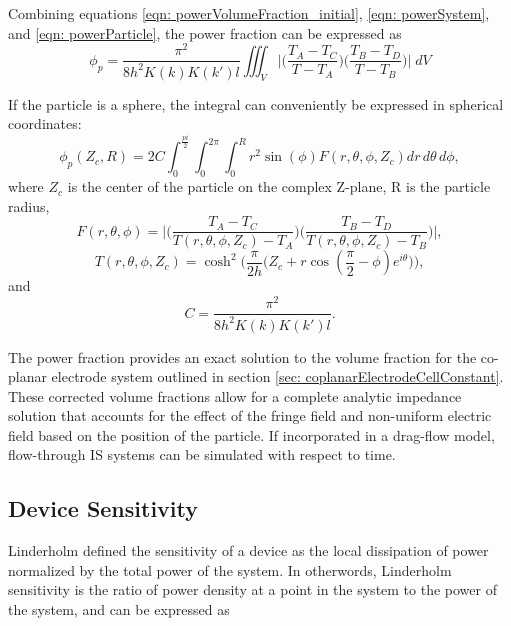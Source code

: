 Combining equations \ref{eqn: powerVolumeFraction_initial}, \ref{eqn: powerSystem}, and \ref{eqn: powerParticle}, the power fraction can be expressed as
\begin{equation}
    \phi_p = \frac{\pi^2 }{8h^2K(k)K(k')l}\iiint_V \bigg|\bigg(\frac{T_A-T_C}{T-T_A}\bigg)\bigg(\frac{T_B-T_D}{T-T_B}\bigg)\bigg| \;dV
\end{equation}

\par If the particle is a sphere, the integral can conveniently be expressed in spherical coordinates:
\begin{equation}
    \phi_p(Z_c,R) = 2C\int_{0}^\frac{pi}{2}\int_0^{2\pi}\int_0^R r^2 \sin(\phi)F(r,\theta,\phi,Z_c)dr\,d\theta\,d\phi,
\end{equation}
\noindent where $Z_c$ is the center of the particle on the complex Z-plane, R is the particle radius,
\begin{equation}
    F(r,\theta,\phi) = \bigg|\bigg(\frac{T_A-T_C}{T(r,\theta,\phi,Z_c)-T_A}\bigg)\bigg(\frac{T_B-T_D}{T(r,\theta,\phi,Z_c)-T_B}\bigg)\bigg|,
\end{equation}
\begin{equation}
    T(r,\theta,\phi,Z_c) = \cosh^2\bigg(\frac{\pi}{2h}\Big(Z_c+r\cos(\frac{\pi}{2}-\phi)e^{i\theta}\Big)\bigg),
\end{equation}
\noindent and
\begin{equation}
    C = \frac{\pi^2}{8h^2K(k)K(k')l}.
\end{equation}

\par The power fraction provides an exact solution to the volume fraction for the co-planar electrode system outlined in section \ref{sec: coplanarElectrodeCellConstant}. These corrected volume fractions allow for a complete analytic impedance solution that accounts for the effect of the fringe field and non-uniform electric field based on the position of the particle. If incorporated in a drag-flow model, flow-through IS systems can be simulated with respect to time.


\subsection{Device Sensitivity}
\par Linderholm defined the sensitivity of a device as the local dissipation of power normalized by the total power of the system. In otherwords, Linderholm sensitivity is the ratio of power density at a point in the system to the power of the system, and can be expressed as


